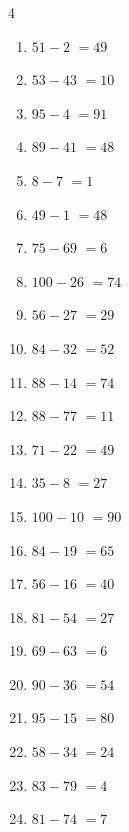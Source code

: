 \begin{multicols}{4}
\begin{enumerate}
  \item $51-2$
        $=49$

  \item $53-43$
        $=10$

  \item $95-4$
        $=91$

  \item $89-41$
        $=48$

  \item $8-7$
        $=1$

  \item $49-1$
        $=48$

  \item $75-69$
        $=6$

  \item $100-26$
        $=74$

  \item $56-27$
        $=29$

  \item $84-32$
        $=52$

  \item $88-14$
        $=74$

  \item $88-77$
        $=11$

  \item $71-22$
        $=49$

  \item $35-8$
        $=27$

  \item $100-10$
        $=90$

  \item $84-19$
        $=65$

  \item $56-16$
        $=40$

  \item $81-54$
        $=27$

  \item $69-63$
        $=6$

  \item $90-36$
        $=54$

  \item $95-15$
        $=80$

  \item $58-34$
        $=24$

  \item $83-79$
        $=4$

  \item $81-74$
        $=7$


\end{enumerate}
\end{multicols}
